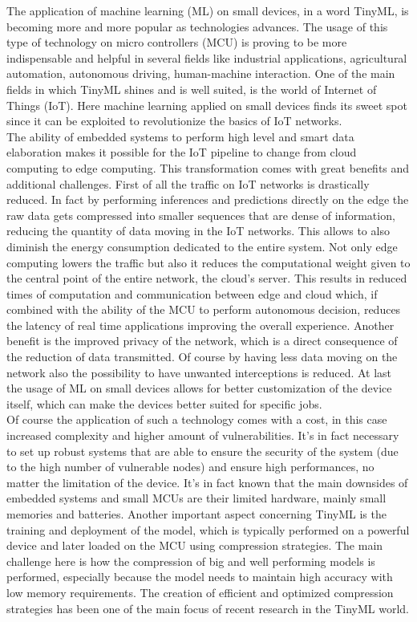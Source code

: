 \documentclass[12pt]{report}
\begin{document}
The application of machine learning (ML) on small devices, in a word TinyML, is becoming more and more popular as technologies advances. The usage of this type of technology on micro controllers (MCU) is proving to be more indispensable and helpful in several fields like industrial applications, agricultural automation, autonomous driving, human-machine interaction. One of the main fields in which TinyML shines and is well suited, is the world of Internet of Things (IoT). Here machine learning applied on small devices finds its sweet spot since it can be exploited to revolutionize the basics of IoT networks.\\
The ability of embedded systems to perform high level and smart data elaboration makes it possible for the IoT pipeline to change from cloud computing to edge computing. This transformation comes with great benefits and additional challenges. 
First of all the traffic on IoT networks is drastically reduced. In fact by performing inferences and predictions directly on the edge the raw data gets compressed into smaller sequences that are dense of information, reducing the quantity of data moving in the IoT networks. This allows to also diminish the energy consumption dedicated to the entire system. 
Not only edge computing lowers the traffic but also it reduces the computational weight given to the central point of the entire network, the cloud's server. This results in reduced times of computation and communication between edge and cloud which, if combined with the ability of the MCU to perform autonomous decision, reduces the latency of real time applications improving the overall experience. 
Another benefit is the improved privacy of the network, which is a direct consequence of the reduction of data transmitted. Of course by having less data moving on the network also the possibility to have unwanted interceptions is reduced. 
At last the usage of ML on small devices allows for better customization of the device itself, which can make the devices better suited for specific jobs. \\
Of course the application of such a technology comes with a cost, in this case increased complexity and higher amount of vulnerabilities. It's in fact necessary to set up robust systems that are able to ensure the security of the system (due to the high number of vulnerable nodes) and ensure high performances, no matter the limitation of the device. It's in fact known that the main downsides of embedded systems and small MCUs are their limited hardware, mainly small memories and batteries. Another important aspect concerning TinyML is the training and deployment of the model, which is typically performed on a powerful device and later loaded on the MCU using compression strategies. The main challenge here is how the compression of big and well performing models is performed, especially because the model needs to maintain high accuracy with low memory requirements. The creation of efficient and optimized compression strategies has been one of the main focus of recent research in the TinyML world. \\
\end{document}

